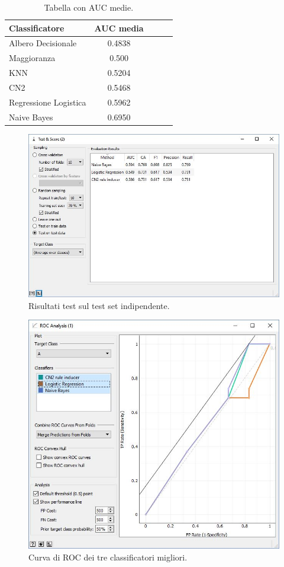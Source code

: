 \documentclass[a4paper, 12p]{report}
\begin{document}
\begin{table}
\centering
\caption{Tabella con AUC medie.}
\label{tab:2}
\begin{tabular}{|l|c|c|c|l|}
\hline
Classificatore & AUC media\\
\hline
Albero Decisionale & 0.4838\\
\hline
Maggioranza & 0.500\\
\hline
KNN & 0.5204\\
\hline
CN2 & 0.5468\\
\hline
Regressione Logistica & 0.5962 \\
\hline
Naive Bayes & 0.6950 \\
\hline
\end{tabular}
\end{table}
\begin{figure}	
	\centering
	\includegraphics[scale = 0.5]{img/score.JPG}
	\caption{Risultati test sul test set indipendente.}\label{fig:8}
\end{figure}
\begin{figure}	
	\centering
	\includegraphics[scale = 0.6]{img/ROC.JPG}
	\caption{Curva di ROC dei tre classificatori migliori.}\label{fig:9}
\end{figure}
\end{document}
